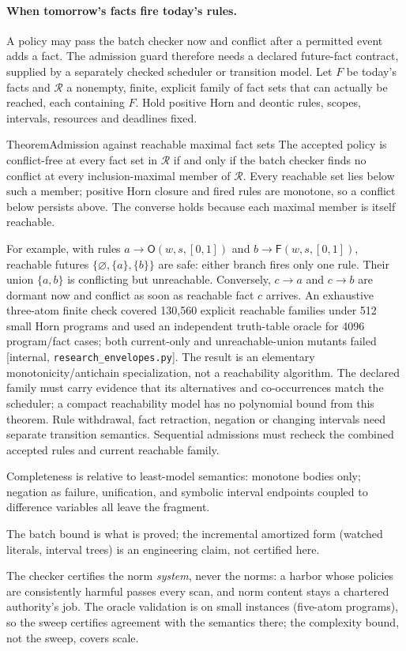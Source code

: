 \documentclass[11pt,a4paper]{article}
\theoremstyle{definition}
\theoremstyle{definition}
\theoremstyle{remark}
\begin{document}
\paragraph{When tomorrow's facts fire today's rules.}\label{sec:he-reachable-admission}
A policy may pass the batch checker now and conflict after a permitted event
adds a fact. The admission guard therefore needs a declared future-fact
contract, supplied by a separately checked scheduler or transition model.
Let $F$ be today's facts and $\mathcal R$ a nonempty, finite, explicit family
of fact sets that can actually be reached, each containing $F$. Hold positive
Horn and deontic rules, scopes, intervals, resources and deadlines fixed.
\begin{pdclaim}{Theorem}{Admission against reachable maximal fact sets}
\label{thm:he-reachable-admission}
The accepted policy is conflict-free at every fact set in $\mathcal R$ if and
only if the batch checker finds no conflict at every inclusion-maximal member
of $\mathcal R$. Every reachable set lies below such a member; positive Horn
closure and fired rules are monotone, so a conflict below persists above.
The converse holds because each maximal member is itself reachable.
\end{pdclaim}
For example, with rules $a\to\mathsf O(w,s,[0,1])$ and
$b\to\mathsf F(w,s,[0,1])$, reachable futures
$\{\varnothing,\{a\},\{b\}\}$ are safe: either branch fires only one rule.
Their union $\{a,b\}$ is conflicting but unreachable. Conversely,
$c\to a$ and $c\to b$ are dormant now and conflict as soon as reachable
fact $c$ arrives. An exhaustive three-atom finite check covered 130{,}560
explicit reachable families under 512 small Horn programs and used an
independent truth-table oracle for 4096 program/fact cases; both current-only
and unreachable-union mutants failed [internal,
\texttt{research\_envelopes.py}]. The result is an elementary
monotonicity/antichain specialization, not a reachability algorithm. The
declared family must carry evidence that its alternatives and co-occurrences
match the scheduler; a compact reachability model has no polynomial bound
from this theorem. Rule withdrawal, fact retraction, negation or changing
intervals need separate transition semantics. Sequential admissions must
recheck the combined accepted rules and current reachable family.

\begin{pdboundary}
\setlength{\parskip}{4pt plus 1pt}
Completeness is relative to least-model semantics: monotone bodies only;
negation as failure, unification, and symbolic interval endpoints coupled to
difference variables all leave the fragment. 

The batch bound is what is proved;
the incremental amortized form (watched literals, interval trees) is an
engineering claim, not certified here. 

The checker certifies the norm
\emph{system}, never the norms: a harbor whose policies are consistently harmful
passes every scan, and norm content stays a chartered authority's job. The
oracle validation is on small instances (five-atom programs), so the sweep
certifies agreement with the semantics there; the complexity bound, not the
sweep, covers scale.
\end{pdboundary}
\end{document}
